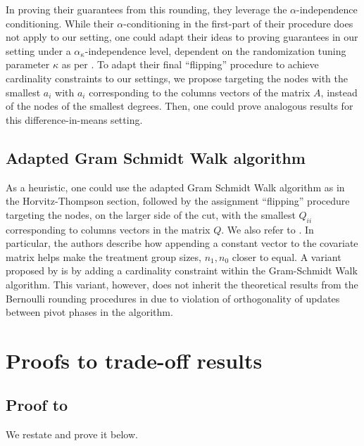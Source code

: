 \documentclass[12pt]{article}
\theoremstyle{definition}
\numberwithin{equation}{section}
\numberwithin{figure}{section}
\numberwithin{equation}{section}
\numberwithin{figure}{section}
\begin{document}
In proving their guarantees from this rounding, they leverage the $\alpha$-independence conditioning. While their $\alpha$-conditioning in the first-part of their procedure  does not apply to our setting, one could adapt their ideas to proving guarantees in our setting under a $\alpha_\kappa$-independence level, dependent on the randomization tuning parameter $\kappa$ as per . To adapt their final ``flipping'' procedure to achieve cardinality constraints to our settings, we propose targeting the nodes with the smallest $a_i$ with $a_i$ corresponding to the columns vectors of the matrix $A$, instead of the nodes of the smallest degrees. Then, one could prove analogous results for this difference-in-means setting.

\subsection{Adapted Gram Schmidt Walk algorithm}

As a heuristic, one could use the adapted Gram Schmidt Walk algorithm as in the Horvitz-Thompson section, followed by the assignment ``flipping'' procedure targeting the nodes, on the larger side of the cut, with the smallest $Q_{ii}$  corresponding to columns vectors in the matrix $Q$. We also refer to \citep[S8.4]{harshaw2024balancing}. In particular, the authors describe how appending a constant vector to the covariate matrix helps make the treatment group sizes, $n_1, n_0$ closer to equal. A variant proposed by \citet[S8.4]{harshaw2024balancing} is by adding a cardinality constraint within the Gram-Schmidt Walk algorithm. This variant, however, does not inherit the theoretical results from the Bernoulli rounding procedures in \citep{harshaw2024balancing} due to violation of orthogonality of updates between pivot phases in the algorithm.



\section{Proofs to trade-off results} \label{proof:trade-offs}


\subsection{Proof to } \label{proof_prop:X_norm_covariance_min}
We restate  and prove it below.
\end{document}
